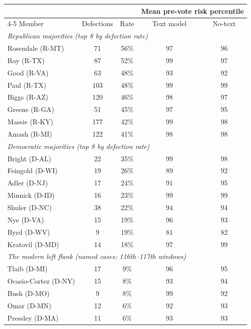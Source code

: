 \begin{tabular}{lcccc}
\toprule
 & & & \multicolumn{2}{c}{Mean pre-vote risk percentile} \\
\cmidrule(lr){4-5}
Member & Defections & Rate & Text model & No-text \\
\midrule
\multicolumn{5}{l}{\emph{Republican majorities (top 8 by defection rate)}} \\
\quad Rosendale (R-MT) & 71 & 56\% & 97 & 96 \\
\quad Roy (R-TX) & 87 & 52\% & 99 & 97 \\
\quad Good (R-VA) & 63 & 48\% & 93 & 92 \\
\quad Paul (R-TX) & 103 & 48\% & 99 & 99 \\
\quad Biggs (R-AZ) & 120 & 46\% & 98 & 97 \\
\quad Greene (R-GA) & 51 & 45\% & 97 & 95 \\
\quad Massie (R-KY) & 177 & 42\% & 99 & 98 \\
\quad Amash (R-MI) & 122 & 41\% & 98 & 98 \\
\multicolumn{5}{l}{\emph{Democratic majorities (top 8 by defection rate)}} \\
\quad Bright (D-AL) & 22 & 35\% & 99 & 98 \\
\quad Feingold (D-WI) & 19 & 26\% & 89 & 92 \\
\quad Adler (D-NJ) & 17 & 24\% & 91 & 95 \\
\quad Minnick (D-ID) & 16 & 23\% & 99 & 99 \\
\quad Shuler (D-NC) & 38 & 22\% & 94 & 94 \\
\quad Nye (D-VA) & 15 & 19\% & 96 & 93 \\
\quad Byrd (D-WV) & 9 & 19\% & 81 & 82 \\
\quad Kratovil (D-MD) & 14 & 18\% & 97 & 99 \\
\multicolumn{5}{l}{\emph{The modern left flank (named cases; 116th--117th windows)}} \\
\quad Tlaib (D-MI) & 17 & 9\% & 96 & 95 \\
\quad Ocasio-Cortez (D-NY) & 15 & 8\% & 93 & 94 \\
\quad Bush (D-MO) & 9 & 8\% & 99 & 92 \\
\quad Omar (D-MN) & 12 & 6\% & 92 & 93 \\
\quad Pressley (D-MA) & 11 & 6\% & 93 & 93 \\
\bottomrule
\end{tabular}
